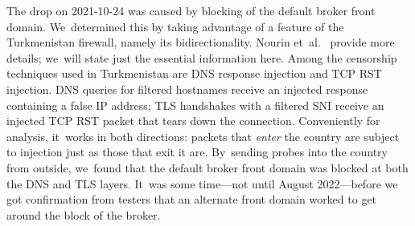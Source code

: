 \documentclass[letterpaper,twocolumn]{article}
\begin{document}
The drop on \mbox{2021-10-24} was caused by
blocking of the default broker front domain.
We~determined this by
taking advantage of a feature of the Turkmenistan firewall,
namely its bidirectionality.
Nourin et~al.~\cite[\S 2]{Nourin2023a} provide more details;
we~will state just the essential information here.
Among the censorship techniques used in Turkmenistan
are DNS response injection and TCP RST injection.
DNS queries for filtered hostnames receive an injected response
containing a false IP address;
TLS handshakes with a filtered SNI receive an injected TCP RST packet
that tears down the connection.
Conveniently for analysis,
it~works in both directions:
packets that \emph{enter} the country are subject to injection
just as those that exit it are.
By~sending probes into the country from outside,
we~found that the default broker front domain
was blocked at both the DNS and TLS layers.
It~was some time---not until August 2022---before we got
confirmation from testers that an alternate front domain
worked to get around the block of the broker.

\end{document}
